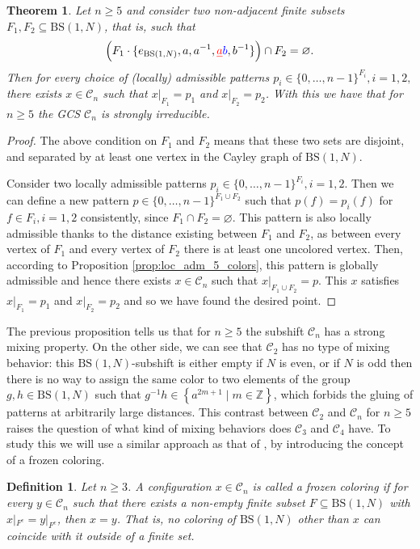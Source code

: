 \documentclass[cupthm,crop,info]{CUP-JNL-ETS}%
\theoremstyle{cupplain}
\newtheorem{theorem}{Theorem}[section]
\theoremstyle{cupdefinition}
\newtheorem{definition}{Definition}[section]
\theoremstyle{cupremark}
\theoremstyle{cupproof}
\newtheorem{proof}{Proof}
\numberwithin{equation}{section}
\newcommand{\BS}[1][N]{\mathrm{BS}(1,#1)}
\providecommand{\DIFadd}[1]{{\protect\color{blue}\uwave{#1}}} %
\providecommand{\DIFdel}[1]{{\protect\color{red}\sout{#1}}}                      %
\providecommand{\DIFaddbegin}{} %
\providecommand{\DIFaddend}{} %
\providecommand{\DIFdelbegin}{} %
\providecommand{\DIFdelend}{} %
\newcommand{\DIFscaledelfig}{0.5}
\newlength{\DIFdelgraphicswidth} %
\newlength{\DIFdelgraphicsheight} %
\newcommand{\DIFaddincludegraphics}[2][]{{\color{blue}\fbox{\DIFOincludegraphics[#1]{#2}}}} %
\newcommand{\DIFdelincludegraphics}[2][]{%
\sbox{\DIFdelgraphicsbox}{\DIFOincludegraphics[#1]{#2}}%
\settoboxwidth{\DIFdelgraphicswidth}{\DIFdelgraphicsbox} %
\settoboxtotalheight{\DIFdelgraphicsheight}{\DIFdelgraphicsbox} %
\scalebox{\DIFscaledelfig}{%
\parbox[b]{\DIFdelgraphicswidth}{\usebox{\DIFdelgraphicsbox}\\[-\baselineskip] \rule{\DIFdelgraphicswidth}{0em}}\llap{\resizebox{\DIFdelgraphicswidth}{\DIFdelgraphicsheight}{%
\setlength{\unitlength}{\DIFdelgraphicswidth}%
\begin{picture}(1,1)%
\thicklines\linethickness{2pt} %
{\color[rgb]{1,0,0}\put(0,0){\framebox(1,1){}}}%
{\color[rgb]{1,0,0}\put(0,0){\line( 1,1){1}}}%
{\color[rgb]{1,0,0}\put(0,1){\line(1,-1){1}}}%
\end{picture}%
}\hspace*{3pt}}} %
} %
\DeclareRobustCommand{\DIFaddbegin}{\DIFOaddbegin \let\includegraphics\DIFaddincludegraphics} %
\DeclareRobustCommand{\DIFaddend}{\DIFOaddend \let\includegraphics\DIFOincludegraphics} %
\DeclareRobustCommand{\DIFdelbegin}{\DIFOdelbegin \let\includegraphics\DIFdelincludegraphics} %
\DeclareRobustCommand{\DIFdelend}{\DIFOaddend \let\includegraphics\DIFOincludegraphics} %
\begin{document}
\begin{theorem}\label{thm:gcs_mixing_n5} Let $n\ge 5$ and consider two non-adjacent finite subsets $F_1,F_2\subseteq \BS$, that is, such that 
	$$\left( F_1\cdot \{e_{\BS},a,a^{-1},\DIFdelbegin \DIFdel{a}\DIFdelend \DIFaddbegin \DIFadd{b}\DIFaddend ,b^{-1}\}\right)\cap F_2=\varnothing.$$
	Then for every choice of (locally) admissible patterns $p_i\in \{0,\ldots,n-1\}^{F_i}, i=1,2,$ there exists $x\in \mathcal{C}_n$ such that $x|_{F_1}=p_1$ and $x|_{F_2}=p_2$. With this we have that for $n\ge 5$ the GCS $\mathcal{C}_n$ is strongly irreducible.
\end{theorem}
\begin{proof}
	The above condition on $F_1$ and $F_2$ means that these two sets are disjoint, and separated by at least one vertex in the Cayley graph of $\BS$. 

	Consider two locally admissible patterns $p_i\in \{0,\ldots,n-1\}^{F_i}, i=1,2$. Then we can define a new pattern $p\in \{0,\ldots,n-1\}^{F_1\cup F_2}$ such that $p(f)=p_i(f)$ for $f\in F_i, i=1,2$ consistently, since $F_1\cap F_2=\varnothing.$ This pattern is also locally admissible thanks to the distance existing between $F_1$ and $F_2$, as between every vertex of $F_1$ and every vertex of $F_2$ there is at least one uncolored vertex. Then, according to Proposition \ref{prop:loc_adm_5_colors}, this pattern is globally admissible and hence there exists $x\in \mathcal{C}_n$ such that $x|_{F_1\cup F_2}=p$. This $x$ satisfies $x|_{F_1}=p_1$ and $x|_{F_2}=p_2$ and so we have found the desired point.
\end{proof}


The previous proposition tells us that for $n\ge 5$ the subshift $\mathcal{C}_n$ has a strong mixing property. On the other side, we can see that $\mathcal{C}_2$ has no type of mixing behavior: this $\BS$-subshift is either empty if $N$ is even, or if $N$ is odd then there is no way to assign the same color to two elements of the group $g,h\in \BS$ such that $g^{-1}h\in \left\{a^{2m+1}\mid m\in \mathbb{Z} \right\}$, which forbids the gluing of patterns at arbitrarily large distances. This contrast between $\mathcal{C}_2$ and $\mathcal{C}_n$ for $n\ge 5$ raises the question of what kind of mixing behaviors does $\mathcal{C}_3$ and $\mathcal{C}_4$ have. To study this we will use a similar approach as that of \cite{alon2019mixing}, by introducing the concept of a frozen coloring.
\begin{definition} Let $n\ge 3$. A configuration $x\in \mathcal{C}_n$ is called a \textit{frozen coloring} if for every $y\in \mathcal{C}_n$ such that there exists a non-empty finite subset $F\subseteq \BS$ with $x|_{F^c}=y|_{F^c}$, then $x= y$. That is, no coloring of $\BS$ other than $x$ can coincide with it outside of a finite set.
\end{definition}
\end{document}
